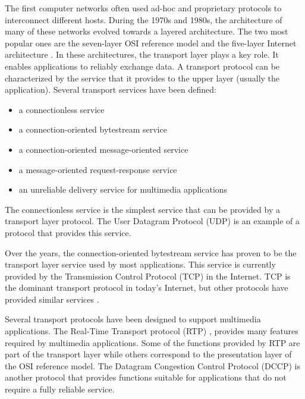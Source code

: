
The first computer networks often used ad-hoc and proprietary
protocols to interconnect different hosts. During the 1970s and 1980s,
the architecture of many of these networks evolved towards a layered
architecture. The two most popular ones are the seven-layer OSI
reference model \cite{zimmermann1980osi} and the five-layer Internet
architecture \cite{clark1988design}. In these architectures, the
transport layer plays a key role. It enables applications to reliably exchange data.
A transport protocol can be characterized by the
service that it provides to the upper layer (usually the
application). Several transport services have been defined:

\begin{itemize}
\item a connectionless service
\item a connection-oriented bytestream service
\item a connection-oriented message-oriented service
\item a message-oriented request-response service
\item an unreliable delivery service for multimedia applications
\end{itemize}

The connectionless service is the simplest service that can be
provided by a transport layer protocol. The User Datagram Protocol
(UDP) \cite{rfc768} is an example of a protocol that provides this
service.

Over the years, 
the connection-oriented bytestream service has proven to be the 
transport layer service used by most applications. 
This service is currently provided by the
Transmission Control Protocol (TCP) \cite{rfc793} in the Internet.
TCP
is the dominant transport protocol in today's Internet, but other
protocols have provided similar services \cite{Iren_Transport:1999}.

Several transport protocols have been designed to support multimedia
applications. The Real-Time Transport protocol (RTP) \cite{rfc3550},
provides many features required by multimedia applications. Some of
the functions provided by RTP are part of the transport layer while
others correspond to the presentation layer of the OSI reference
model. The Datagram Congestion Control Protocol (DCCP) \cite{rfc4340}
is another protocol that provides functions suitable for applications
that do not require a fully reliable service.

